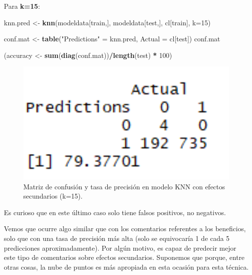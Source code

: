 \documentclass[spanish,]{article}
\newenvironment{Shaded}{\begin{snugshade}}{\end{snugshade}}
\newcommand{\KeywordTok}[1]{\textcolor[rgb]{0.13,0.29,0.53}{\textbf{#1}}}
\newcommand{\DataTypeTok}[1]{\textcolor[rgb]{0.13,0.29,0.53}{#1}}
\newcommand{\DecValTok}[1]{\textcolor[rgb]{0.00,0.00,0.81}{#1}}
\newcommand{\StringTok}[1]{\textcolor[rgb]{0.31,0.60,0.02}{#1}}
\newcommand{\OperatorTok}[1]{\textcolor[rgb]{0.81,0.36,0.00}{\textbf{#1}}}
\newcommand{\NormalTok}[1]{#1}
\begin{document}
Para \textbf{k=15}:

\begin{Shaded}
\begin{Highlighting}[]
\NormalTok{knn.pred <-}\StringTok{ }\KeywordTok{knn}\NormalTok{(modeldata[train,], modeldata[test,], cl[train], }\DataTypeTok{k=}\DecValTok{15}\NormalTok{) }

\NormalTok{conf.mat <-}\StringTok{ }\KeywordTok{table}\NormalTok{(}\StringTok{"Predictions"}\NormalTok{ =}\StringTok{ }\NormalTok{knn.pred, }\DataTypeTok{Actual =}\NormalTok{ cl[test])}
\NormalTok{conf.mat}

\NormalTok{(accuracy <-}\StringTok{ }\KeywordTok{sum}\NormalTok{(}\KeywordTok{diag}\NormalTok{(conf.mat))}\OperatorTok{/}\KeywordTok{length}\NormalTok{(test) }\OperatorTok{*}\StringTok{ }\DecValTok{100}\NormalTok{)}
\end{Highlighting}
\end{Shaded}

\begin{figure}[h]
    \centering
    \includegraphics[width=1\textwidth]{figuras/KNN/effects_k15.png}
    \caption{Matriz de confusión y tasa de precisión en modelo KNN con efectos secundarios (k=15).}
    \label{fig:KNN:effectsK15}
\end{figure}

Es curioso que en este último caso solo tiene falsos positivos, no
negativos.

Vemos que ocurre algo similar que con los comentarios referentes a los
beneficios, solo que con una tasa de precisión más alta (solo se
equivocaría 1 de cada 5 predicciones aproximadamente). Por algún motivo,
es capaz de predecir mejor este tipo de comentarios sobre efectos
secundarios. Suponemos que porque, entre otras cosas, la nube de puntos
es más apropiada en esta ocasión para esta técnica.
\end{document}
